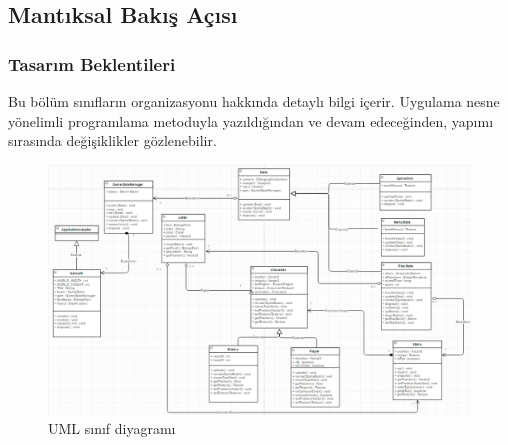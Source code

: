 \documentclass[12pt,a4paper]{article}
\begin{document}
   \subsection{Mantıksal Bakış Açısı}

   \subsubsection{Tasarım Beklentileri}
   Bu bölüm sınıfların organizasyonu hakkında detaylı bilgi içerir. Uygulama nesne yönelimli programlama metoduyla yazıldığından ve devam edeceğinden, yapımı sırasında değişiklikler gözlenebilir.
   \begin{figure}
      \begin{center}
         \includegraphics[width=\linewidth]{img/img3.png}
         \caption{UML sınıf diyagramı}
         \label{fig:uc}
      \end{center}
   \end{figure}
\end{document}
